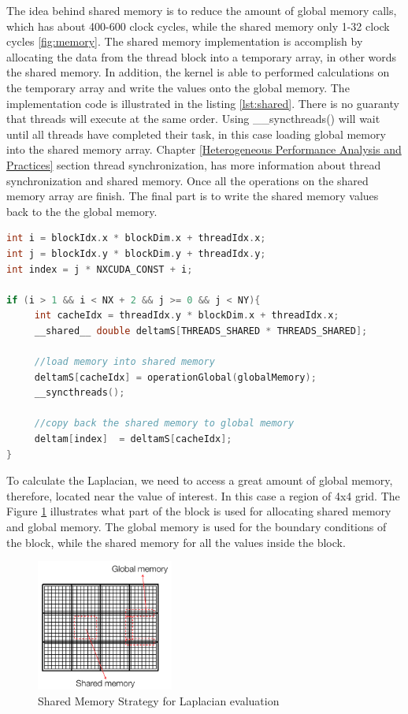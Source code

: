 The idea behind shared memory is to reduce the amount of global memory calls, which has about 400-600 clock cycles, while the shared memory only 1-32 clock cycles \ref{fig:memory}. The shared memory implementation is accomplish by allocating the data from the thread block into a temporary array, in other words the shared memory. In addition, the kernel is able to performed calculations on the temporary array and write the values onto the global memory. The implementation code is illustrated in the listing \ref{lst:shared}. There is no guaranty that threads will execute at the same order. Using {\listf \_\_syncthreads()} will wait until all threads have completed their task, in this case loading global memory into the shared memory array. Chapter \ref{Heterogeneous Performance Analysis and Practices} section thread synchronization, has more information about thread synchronization and shared memory. Once all the operations on the shared memory array are finish. The final part is to write the shared memory values back to the the global memory.

\begin{lstlisting}[language=C++, label={lst:shared}, caption={Shared memory}]
int i = blockIdx.x * blockDim.x + threadIdx.x;
int j = blockIdx.y * blockDim.y + threadIdx.y;
int index = j * NXCUDA_CONST + i;

if (i > 1 && i < NX + 2 && j >= 0 && j < NY){
     int cacheIdx = threadIdx.y * blockDim.x + threadIdx.x;
     __shared__ double deltamS[THREADS_SHARED * THREADS_SHARED];

	 //load memory into shared memory
     deltamS[cacheIdx] = operationGlobal(globalMemory);
     __syncthreads();

	 //copy back the shared memory to global memory
     deltam[index]  = deltamS[cacheIdx];
}
\end{lstlisting}

To calculate the Laplacian, we need to access a great amount of global memory, therefore, located near the value of interest. In this case a region of 4x4 grid. The Figure \ref{fig:shared} illustrates what part of the block is used for allocating shared memory and global memory. The global memory is used for the boundary conditions of the block, while the shared memory for all the values inside the block.

\begin{figure}[htbp]
	\centering
		\includegraphics[width=0.4\textwidth]{Figures/shared.png}
		\smallskip
	\caption[Shared Memory Strategy]{Shared Memory Strategy for Laplacian evaluation }
	\label{fig:shared}
\end{figure}

